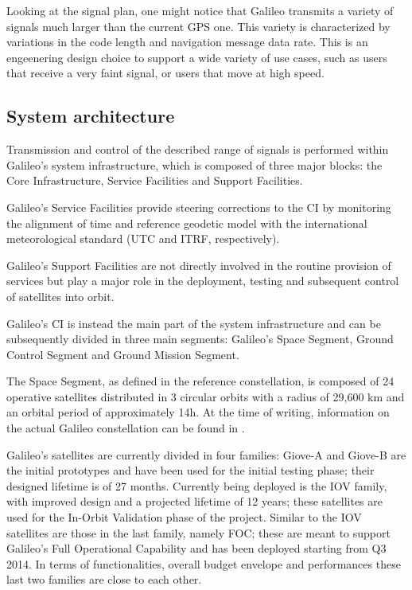 Looking at the signal plan, one might notice that Galileo transmits a variety of
signals much larger than the current GPS one. This variety is characterized by
variations in the code length and navigation message data rate. This is an
engeenering design choice to support a wide variety of use cases, such as users
that receive a very faint signal, or users that move at high speed.

\subsection{System architecture}
Transmission and control of the described range of signals is performed within
Galileo's system infrastructure, which is composed of three major blocks: the
Core Infrastructure, Service Facilities and Support Facilities.

Galileo's Service Facilities provide steering corrections to the CI by
monitoring the alignment of time and reference geodetic model with the
international meteorological standard (UTC and ITRF, respectively).

Galileo's Support Facilities are not directly involved in the routine provision
of services but play a major role in the deployment, testing and subsequent
control of satellites into orbit.

Galileo's CI is instead the main part of the system infrastructure and can be
subsequently divided in three main segments: Galileo's Space Segment, Ground
Control Segment and Ground Mission Segment.

The Space Segment, as defined in the reference constellation, is composed of 24
operative satellites distributed in 3 circular orbits with a radius of 29,600 km
and an orbital period of approximately 14h. At the time of writing, information
on the actual Galileo constellation can be found in \cite{galileo_constellation}.

Galileo's satellites are currently divided in four families: Giove-A and Giove-B
are the initial prototypes and have been used for the initial testing phase;
their designed lifetime is of 27 months. Currently being deployed is the IOV
family, with improved design and a projected lifetime of 12 years; these
satellites are used for the In-Orbit Validation phase of the project. Similar to
the IOV satellites are those in the last family, namely FOC; these are meant to
support Galileo's Full Operational Capability and has been deployed starting
from Q3 2014. In terms of functionalities, overall budget envelope and
performances these last two families are close to each other.

